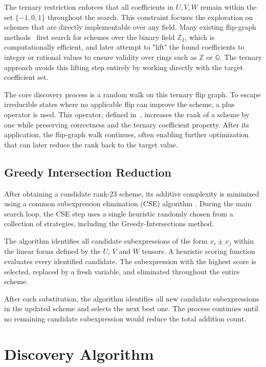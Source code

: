 \documentclass{article}
\begin{document}
The ternary restriction enforces that all coefficients in $U, V, W$ remain within the set $\{-1, 0, 1\}$ throughout the search. This constraint focuses the exploration on schemes that are directly implementable over any field. Many existing flip-graph methods~\citep{kauers2023flip, moosbauer2025flip} first search for schemes over the binary field $\mathbb{Z}_2$, which is computationally efficient, and later attempt to "lift" the found coefficients to integer or rational values to ensure validity over rings such as $\mathbb{Z}$ or $\mathbb{Q}$. The ternary approach avoids this lifting step entirely by working directly with the target coefficient set.

The core discovery process is a random walk on this ternary flip graph. To escape irreducible states where no applicable flip can improve the scheme, a plus operator is used. This operator, defined in~\citep{arai2024adaptive}, increases the rank of a scheme by one while preserving correctness and the ternary coefficient property. After its application, the flip-graph walk continues, often enabling further optimization that can later reduce the rank back to the target value.


\subsection{Greedy Intersection Reduction}
\label{subsec:reduction}

After obtaining a candidate rank-23 scheme, its additive complexity is minimized using a common subexpression elimination (CSE) algorithm \cite{perminov2025parallel}. During the main search loop, the CSE step uses a single heuristic randomly chosen from a collection of strategies, including the Greedy-Intersections method.

The algorithm identifies all candidate subexpressions of the form $x_i \pm x_j$ within the linear forms defined by the $U$, $V$ and $W$ tensors. A heuristic scoring function evaluates every identified candidate. The subexpression with the highest score is selected, replaced by a fresh variable, and eliminated throughout the entire scheme.

After each substitution, the algorithm identifies all new candidate subexpressions in the updated scheme and selects the next best one. The process continues until no remaining candidate subexpression would reduce the total addition count.


\section{Discovery Algorithm}
\label{subsec:algorithm}
\end{document}
